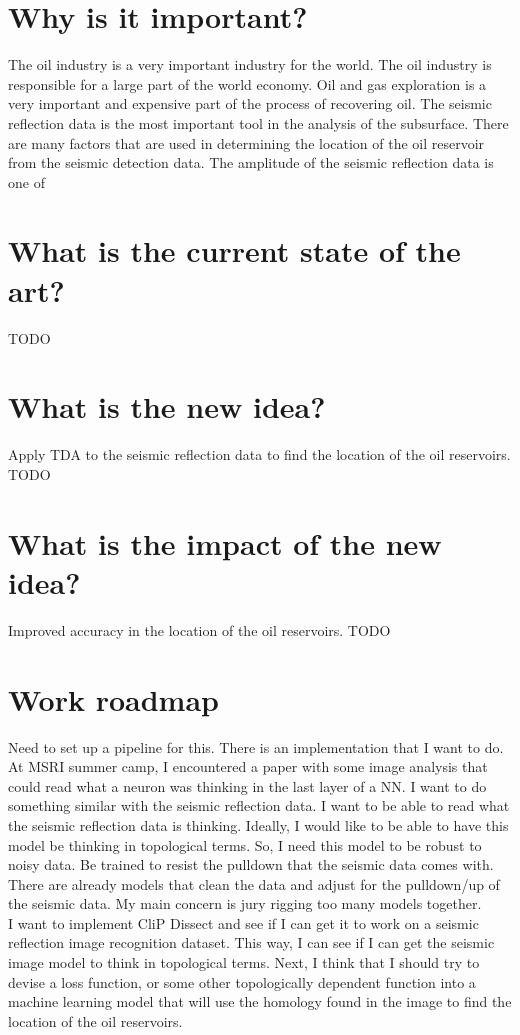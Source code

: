 \documentclass{article}
\begin{document}
\section{Why is it important?}

The oil industry is a very important industry for the world. The oil industry is responsible for a
large part of the world economy. Oil and gas exploration is a very important and expensive part of
the process of recovering oil. The seismic reflection data is the most important tool in the
analysis of the subsurface. There are many factors that are used in determining the location of the
oil reservoir from the seismic detection data. The amplitude of the seismic reflection data is one
of


\section{What is the current state of the art?}

TODO

\section{What is the new idea?}

Apply TDA to the seismic reflection data to find the location of the oil reservoirs. TODO

\section{What is the impact of the new idea?}

Improved accuracy in the location of the oil reservoirs. TODO

\section{Work roadmap}

Need to set up a pipeline for this. There is an implementation that I want to do. At MSRI summer
camp, I encountered a paper with some image analysis that could read what a neuron was thinking in
the last layer of a NN. I want to do something similar with the seismic reflection data. I want to
be able to read what the seismic reflection data is thinking. Ideally, I would like to be able to
have this model be thinking in topological terms. So, I need this model to be robust to noisy data.
Be trained to resist the pulldown that the seismic data comes with. There are already models that
clean the data and adjust for the pulldown/up of the seismic data. My main concern is jury rigging
too many models together. \\ I want to implement CliP Dissect and see if I can get it to work on a
seismic reflection image recognition dataset. This way, I can see if I can get the seismic image model
to think in topological terms. Next, I think that I should try to devise a loss function, or some
other topologically dependent function into a machine learning model that will use the homology
found in the image to find the location of the oil reservoirs.







\end{document}
